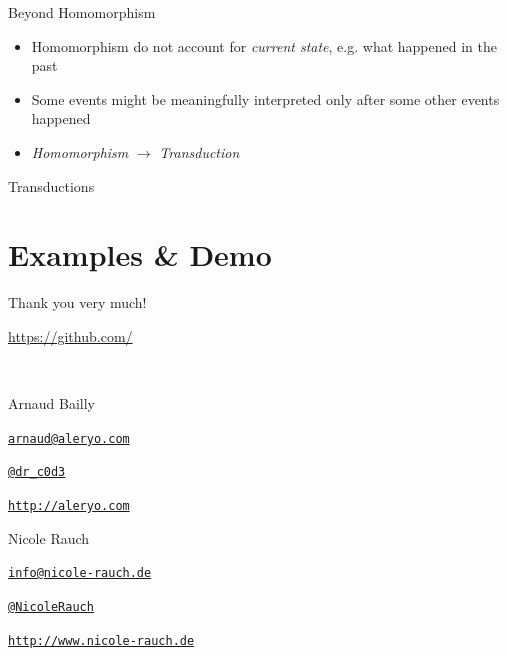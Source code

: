 \begin{frame}[fragile]{Beyond Homomorphism}
  \begin{itemize}
  \item Homomorphism do not account for \emph{current state}, e.g. what happened in the past
  \item Some events might be meaningfully interpreted only after some other events happened
  \item \emph{Homomorphism} $\longrightarrow$ \emph{Transduction}
  \end{itemize}
\end{frame}

\begin{frame}[fragile]{Transductions}
\end{frame}



\section{Examples \& Demo}

\begin{frame}{Thank you very much!}

  \url{https://github.com/}

  ~\\[1em]
  \begin{block}{Arnaud Bailly}
        \begin{description}[Twitterxx]
        \item[E-Mail]  \href{mailto:arnaud@aleryo.com}{\texttt{arnaud@aleryo.com}}
        \item[Twitter] \href{http://twitter.com/NicoleRauch}{\texttt{@dr\_c0d3}}
        \item[Web] \href{http://aleryo.com}{\texttt{http://aleryo.com}}
        \end{description}
  \end{block}
  \begin{block}{Nicole Rauch}
    \begin{description}[Twitterxx]
    \item[E-Mail]  \href{mailto:info@nicole-rauch.de}{\texttt{info@nicole-rauch.de}}
    \item[Twitter] \href{http://twitter.com/NicoleRauch}{\texttt{@NicoleRauch}}
    \item[Web] \href{http://www.nicole-rauch.de}{\texttt{http://www.nicole-rauch.de}}
    \end{description}
  \end{block}
\end{frame}
